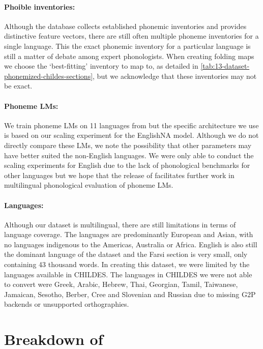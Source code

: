 \paragraph{Phoible inventories:} Although the \phoible database collects established phonemic inventories and provides distinctive feature vectors, there are still often multiple phoneme inventories for a single language. This the exact phonemic inventory for a particular language is still a matter of debate among expert phonologists. When creating folding maps we choose the `best-fitting' inventory to map to, as detailed in \cref{tab:13-dataset-phonemized-childes-sections}, but we acknowledge that these inventories may not be exact.

\paragraph{Phoneme LMs:} We train phoneme LMs on 11 languages from \ipachildes but the specific architecture we use is based on our scaling experiment for the EnglishNA model. Although we do not directly compare these LMs, we note the possibility that other parameters may have better suited the non-English languages. We were only able to conduct the scaling experiments for English due to the lack of phonological benchmarks for other languages but we hope that the release of \ipachildes facilitates further work in multilingual phonological evaluation of phoneme LMs.

\paragraph{Languages:} Although our dataset is multilingual, there are still limitations in terms of language coverage. The languages are predominantly European and Asian, with no languages indigenous to the Americas, Australia or Africa. English is also still the dominant language of the dataset and the Farsi section is very small, only containing 43 thousand words. In creating this dataset, we were limited by the languages available in CHILDES. The languages in CHILDES we were not able to convert were Greek, Arabic, Hebrew, Thai, Georgian, Tamil, Taiwanese, Jamaican, Sesotho, Berber, Cree and Slovenian and Russian due to missing G2P backends or unsupported orthographies.

\section{Breakdown of \ipachildes}\label{app:13-breakdown}


